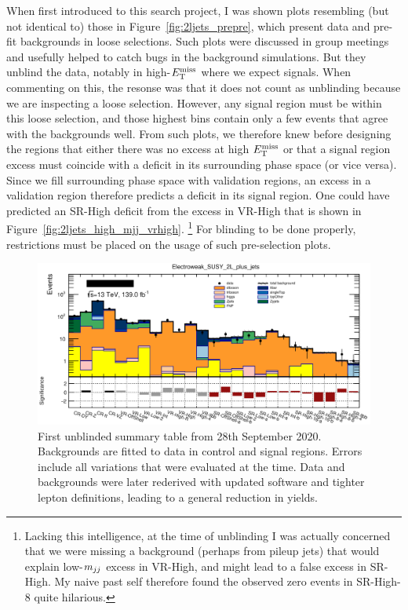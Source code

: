When first introduced to this search project, I was shown plots resembling
(but not identical to) those in Figure~\ref{fig:2ljets_prepre}, which present
data and pre-fit backgrounds in loose selections.
Such plots were discussed in group meetings and usefully helped to catch bugs
in the background simulations.
But they unblind the data, notably in high-$E_\mathrm{T}^\mathrm{miss}$ where we expect signals.
When commenting on this, the resonse was that it does not count as unblinding
because we are inspecting a loose selection.
However, any signal region must be within this loose selection, and those
highest bins contain only a few events that agree with the backgrounds well.
From such plots, we therefore knew before designing the regions that either
there was no excess at high $E_\mathrm{T}^\mathrm{miss}$ or that a signal region excess must
coincide with a deficit in its surrounding phase space (or vice versa).
Since we fill surrounding phase space with validation regions, an excess in a
validation region therefore predicts a deficit in its signal region.
One could have predicted an SR-High deficit from the excess in VR-High
that is shown in Figure~\ref{fig:2ljets_high_mjj_vrhigh}.%
\footnote{%
Lacking this intelligence, at the time of unblinding I was actually concerned
that we were missing a background (perhaps from pileup jets) that would
explain low-$m_{jj}$ excess in VR-High, and might lead to a false excess
in SR-High.
My naive past self therefore found the observed zero events in SR-High-8
quite hilarious.
}
For blinding to be done properly, restrictions must be placed on the usage of
such pre-selection plots.

\begin{figure}[tp]
\centering
\includegraphics[width=\textwidth]{figures/2ljets_summary_unblinding_log.png}
\caption[
First unblinded summary table from 28th September 2020
]{%
First unblinded summary table from 28th September 2020.
Backgrounds are fitted to data in control and signal regions.
Errors include all variations that were evaluated at the time.
Data and backgrounds were later rederived with updated software and tighter
lepton definitions, leading to a general reduction in yields.
}
\label{fig:2ljets_summary_unblinding}
\end{figure}

